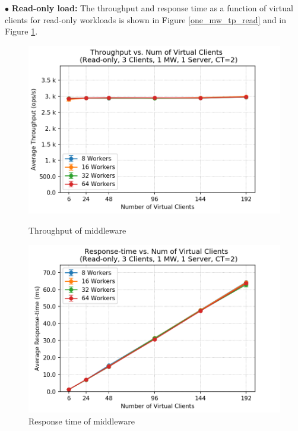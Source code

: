 $\bullet$ \textbf{Read-only load:} 
The throughput and response time as a function of virtual clients for read-only workloads is shown in Figure \ref{one_mw_tp_read} and in Figure \ref{one_mw_rt_read}. 
\begin{figure}[H]
   \begin{minipage}{0.48\textwidth}
     \centering
     \includegraphics[width=1\linewidth]{figures/2_BaselineWithMW/one_mw/one_mw_tp_read_2018-12-06_23h08.png}
     \caption{Throughput of middleware}\label{one_mw_tp_read}
   \end{minipage}\hfill
   \begin{minipage}{0.48\textwidth}
     \centering
     \includegraphics[width=1\linewidth]{figures/2_BaselineWithMW/one_mw/one_mw_rt_read_2018-12-06_23h08.png}
     \caption{Response time of middleware}\label{one_mw_rt_read}
   \end{minipage}
\end{figure}


